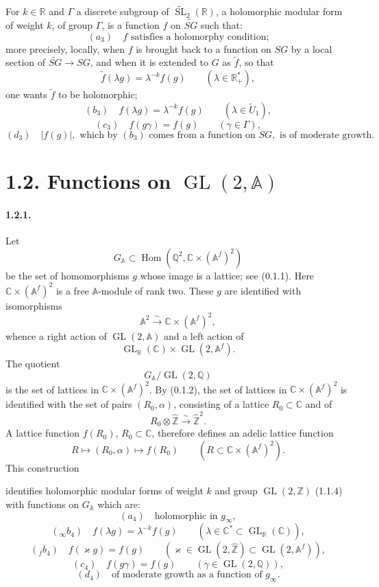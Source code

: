\documentclass[10pt,a4paper]{article}
\providecommand{\GL}{\operatorname{GL}}
\providecommand{\SL}{\operatorname{SL}}
\providecommand{\Hom}{\operatorname{Hom}}
\providecommand{\R}{\mathbb R}
\providecommand{\Q}{\mathbb Q}
\providecommand{\Z}{\mathbb Z}
\providecommand{\C}{\mathbb C}
\providecommand{\A}{\mathbb A}
\providecommand{\Af}{\mathbb A^f}
\providecommand{\GA}{G_{\mathbb A}}
\providecommand{\iso}{\xrightarrow{\sim}}
\begin{document}
For \(k\in\R\) and \(\Gamma\) a discrete subgroup of \(\widetilde{\SL}_2(\R)\), a holomorphic modular form of weight \(k\), of group \(\Gamma\), is a function \(f\) on \(\widetilde{SG}\) such that:
\[
(a_3)\quad
f\text{ satisfies a holomorphy condition;}
\]
more precisely, locally, when \(f\) is brought back to a function on \(SG\) by a local section of \(\widetilde{SG}\to SG\), and when it is extended to \(G\) as \(\widetilde f\), so that
\[
\widetilde f(\lambda g)=\lambda^{-k}f(g)\qquad(\lambda\in\R_+^*),
\]
one wants \(\widetilde f\) to be holomorphic;
\[
(b_3)\quad f(\lambda g)=\lambda^{-k}f(g)\qquad(\lambda\in\widetilde U_1),
\]
\[
(c_3)\quad f(g\gamma)=f(g)\qquad(\gamma\in\Gamma),
\]
\[
(d_3)\quad |f(g)|,\text{ which by }(b_3)\text{ comes from a function on }SG,\text{ is of moderate growth.}
\]

\section*{1.2. Functions on \(\GL(2,\A)\)}

\paragraph{1.2.1.} Let
\[
\GA\subset\Hom(\Q^2,\C\times(\Af)^2)
\]
be the set of homomorphisms \(g\) whose image is a lattice; see (0.1.1). Here \(\C\times(\Af)^2\) is a free \(\A\)-module of rank two. These \(g\) are identified with isomorphisms
\[
\A^2\iso\C\times(\Af)^2,
\]
whence a right action of \(\GL(2,\A)\) and a left action of
\[
\GL_{\R}(\C)\times\GL(2,\Af).
\]
The quotient
\[
\GA/\GL(2,\Q)
\]
is the set of lattices in \(\C\times(\Af)^2\). By (0.1.2), the set of lattices in \(\C\times(\Af)^2\) is identified with the set of pairs \((R_0,\alpha)\), consisting of a lattice \(R_0\subset\C\) and of
\[
R_0\otimes\widehat{\Z}\iso\widehat{\Z}^2.
\]
A lattice function \(f(R_0)\), \(R_0\subset\C\), therefore defines an adelic lattice function
\[
R\longmapsto(R_0,\alpha)\longmapsto f(R_0)
\qquad(R\subset\C\times(\Af)^2).
\]
This construction

\clearpage
{}
\hypertarget{authority-16}{}
identifies holomorphic modular forms of weight $k$ and group $\GL(2,\Z)$ (1.1.4) with functions on $\GA$ which are:
\[
(a_4)\quad \text{holomorphic in }g_\infty,
\]
\[
({}_{\infty}b_4)\quad f(\lambda g)=\lambda^{-k}f(g)\qquad(\lambda\in\C^*\subset\GL_{\R}(\C)),
\]
\[
({}_{f}b_4)\quad f(\varkappa g)=f(g)\qquad(\varkappa\in\GL(2,\widehat{\Z})\subset\GL(2,\Af)),
\]
\[
(c_4)\quad f(g\gamma)=f(g)\qquad(\gamma\in\GL(2,\Q)),
\]
\[
(d_4)\quad \text{of moderate growth as a function of }g_\infty.
\]
\end{document}
